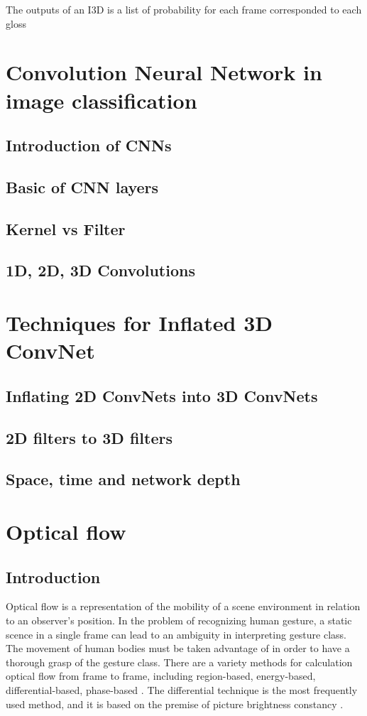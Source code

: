 \documentclass[a4paper, 12pt]{article}
\begin{document}
The outputs of an I3D is a list of probability for each frame corresponded to each gloss 

\section{Convolution Neural Network in image classification}
\subsection{Introduction of CNNs}
\subsection{Basic of CNN layers}
\subsection{Kernel vs Filter}
\subsection{1D, 2D, 3D Convolutions}

\section{Techniques for Inflated 3D ConvNet}
\subsection{Inflating 2D ConvNets into 3D ConvNets}
\subsection{2D filters to 3D filters}
\subsection{Space, time and network depth}

\section{Optical flow}
\subsection{Introduction}
Optical flow is a representation of the mobility of a scene environment in relation to an observer's position. In the problem of recognizing human gesture, a static scence in a single frame can lead to an ambiguity in interpreting gesture class.  The movement of human bodies must be taken advantage of in order to have a thorough grasp of the gesture class. There are a variety methods for calculation optical flow from frame to frame, including region-based, energy-based, differential-based, phase-based \citep{marco2018computer}. The differential technique is the most frequently used method, and it is based on the premise of picture brightness constancy \citep{horn1981determining}.
\end{document}
